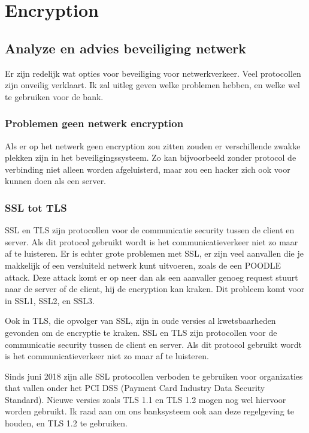 \documentclass{article}
\begin{document}
\newpage

\section{Encryption}

\subsection{Analyze en advies beveiliging netwerk} 

Er zijn redelijk wat opties voor beveiliging voor netwerkverkeer.
Veel protocollen zijn onveilig verklaart.
Ik zal uitleg geven welke problemen hebben, en welke wel te gebruiken voor de bank.

\subsubsection{Problemen geen netwerk encryption}

Als er op het netwerk geen encryption zou zitten zouden er verschillende zwakke plekken zijn in het beveiligingssysteem.
Zo kan bijvoorbeeld zonder protocol de verbinding niet alleen worden afgeluisterd, maar zou een hacker zich ook voor kunnen doen als een server.

\subsubsection{SSL tot TLS}

SSL en TLS zijn protocollen voor de communicatie security tussen de client en server.
Als dit protocol gebruikt wordt is het communicatieverkeer niet zo maar af te luisteren.
Er is echter grote problemen met SSL, er zijn veel aanvallen die je makkelijk of een versluiteld netwerk kunt uitvoeren, zoals de een POODLE attack.
Deze attack komt er op neer dan als een aanvaller genoeg request stuurt naar de server of de client, hij de encryption kan kraken.
Dit probleem komt voor in SSL1, SSL2, en SSL3.

Ook in TLS, die opvolger van SSL, zijn in oude versies al kwetsbaarheden gevonden om de encryptie te kraken.
SSL en TLS zijn protocollen voor de communicatie security tussen de client en server.
Als dit protocol gebruikt wordt is het communicatieverkeer niet zo maar af te luisteren.

Sinds juni 2018 zijn alle SSL protocollen verboden te gebruiken voor organizaties that vallen onder het PCI DSS (Payment Card Industry Data Security Standard).
Nieuwe versies zoals TLS 1.1 en TLS 1.2 mogen nog wel hiervoor worden gebruikt.
Ik raad aan om ons banksysteem ook aan deze regelgeving te houden, en TLS 1.2 te gebruiken.
\end{document}
